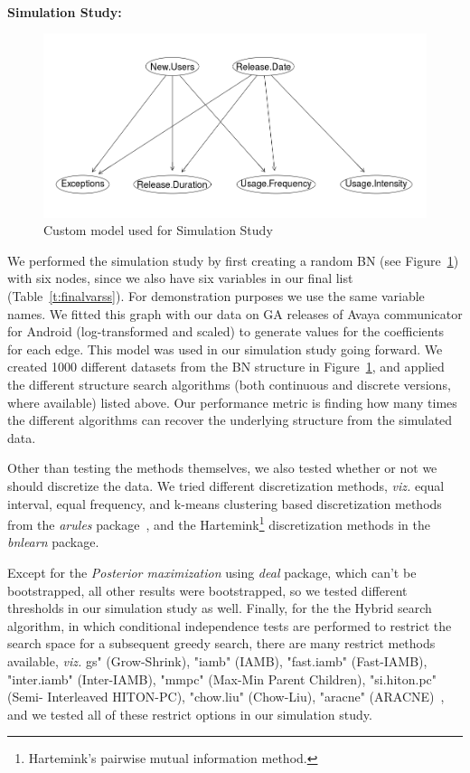 \documentclass[smallextended]{svjour3}       %
\begin{document}
\noindent\\
\textbf{Simulation Study:}\\
\begin{figure}
\centering
\includegraphics[width=0.65\linewidth]{custom}
\caption{Custom model used for Simulation Study}
\label{fig:theory}
\vspace{-15pt}
\end{figure}
We performed the simulation study by first creating 
a random BN (see Figure~\ref{fig:theory}) with 
six nodes, since we also have six variables in our final list (Table~\ref{t:finalvarss}).
For demonstration purposes  we use the same variable names. 
We fitted this graph with our data on GA releases of Avaya communicator for Android
 (log-transformed and scaled) to generate values for the coefficients 
for each edge. This model was used in our simulation study going forward.
We created 1000 different datasets from the BN structure in Figure~\ref{fig:theory},
and applied the different structure search algorithms 
(both continuous and discrete versions, where available) listed above. Our performance metric
is finding how many times the different algorithms can recover the 
underlying structure from the simulated data. 

Other than testing the methods  themselves, we also tested whether or not we should 
discretize the data. We tried different discretization methods, \textit{viz.} 
equal interval, equal frequency, and
k-means clustering based discretization methods from the
\textit{arules} package~\cite{arulesR}, and the 
Hartemink\footnote{Hartemink's pairwise mutual information 
method\cite{hartemink2001principled}.} discretization methods 
in the \textit{bnlearn} package.

Except for the \textit{Posterior maximization} using \textit{deal} package, which can't be bootstrapped, 
all other results were bootstrapped, so we tested different thresholds in our 
simulation study as well. Finally, for the the Hybrid search algorithm, in which
conditional independence tests are performed to restrict
the search space for a subsequent greedy search, there are many restrict methods
available, \textit{viz.} gs" (Grow-Shrink), "iamb" (IAMB), "fast.iamb" (Fast-IAMB), "inter.iamb" (Inter-IAMB), "mmpc" (Max-Min Parent Children), "si.hiton.pc" (Semi- Interleaved HITON-PC), "chow.liu" (Chow-Liu), "aracne" (ARACNE)~\cite{bnlearnR}, and we tested all of these restrict options 
in our simulation study. 
\end{document}
